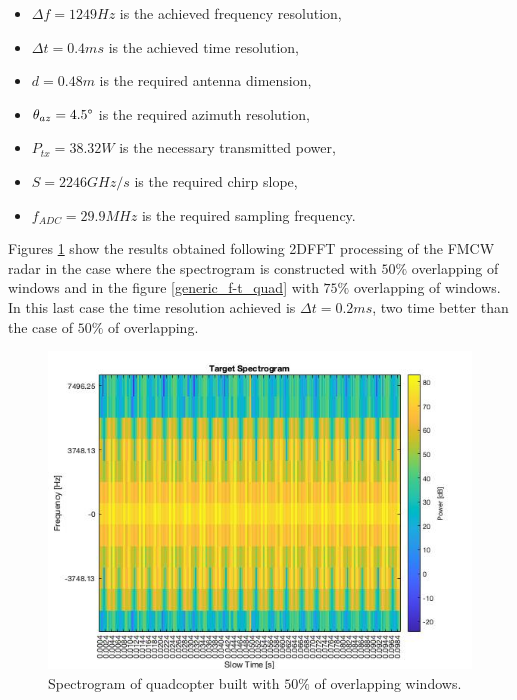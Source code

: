 \begin{itemize}
    
    \item $\Delta f = 1249 Hz$ is the achieved frequency resolution,
    
    \item $\Delta t = 0.4 ms$ is the achieved time resolution,
    
    \item $d = 0.48 m$ is the required antenna dimension,
         
    \item $\theta_{az} = 4.5\degree$ is the required azimuth resolution,

    \item $P_{tx} = 38.32 W$ is the necessary transmitted power,
    
    \item $S = 2246 GHz/s$ is the required chirp slope,
    
    \item $f_{ADC} = 29.9 MHz$ is the required sampling frequency.
    
\end{itemize}

Figures \ref{generic_f-t_helic} show the results obtained following 2DFFT processing of the FMCW radar in the case where the spectrogram is constructed with $50\%$ overlapping of windows and in the figure \ref{generic_f-t_quad} with $75\%$ overlapping of windows. In this last case the time resolution achieved is $\Delta t = 0.2 ms$, two time better than the case of $50\%$ of overlapping. 

\begin{figure}[h!]
\centering
\includegraphics[width=12cm]{FMCW mD analysis-chap4/img/quad_spect_max_res_50.jpg}
\caption{Spectrogram of quadcopter built with $50\%$ of overlapping windows.}
\label{generic_f-t_helic}
\end{figure}

